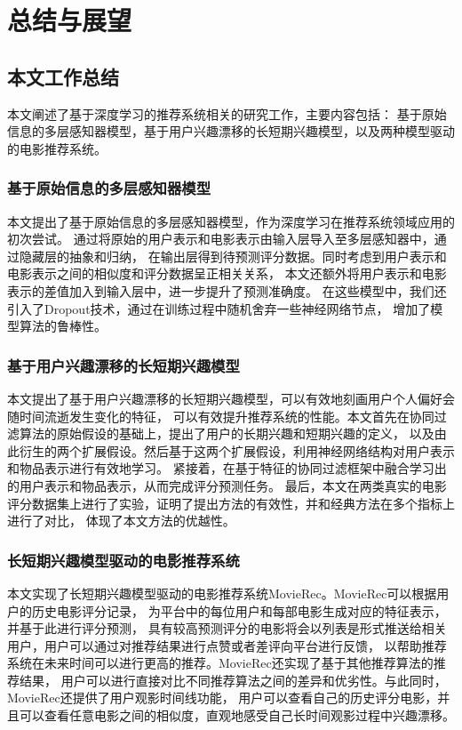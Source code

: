 \chapter{总结与展望}
\section{本文工作总结}
本文阐述了基于深度学习的推荐系统相关的研究工作，主要内容包括：
基于原始信息的多层感知器模型，基于用户兴趣漂移的长短期兴趣模型，以及两种模型驱动的电影推荐系统。

\subsection{基于原始信息的多层感知器模型}
本文提出了基于原始信息的多层感知器模型，作为深度学习在推荐系统领域应用的初次尝试。
通过将原始的用户表示和电影表示由输入层导入至多层感知器中，通过隐藏层的抽象和归纳，
在输出层得到待预测评分数据。同时考虑到用户表示和电影表示之间的相似度和评分数据呈正相关关系，
本文还额外将用户表示和电影表示的差值加入到输入层中，进一步提升了预测准确度。
在这些模型中，我们还引入了Dropout技术，通过在训练过程中随机舍弃一些神经网络节点，
增加了模型算法的鲁棒性。

\subsection{基于用户兴趣漂移的长短期兴趣模型}
本文提出了基于用户兴趣漂移的长短期兴趣模型，可以有效地刻画用户个人偏好会随时间流逝发生变化的特征，
可以有效提升推荐系统的性能。本文首先在协同过滤算法的原始假设的基础上，提出了用户的长期兴趣和短期兴趣的定义，
以及由此衍生的两个扩展假设。然后基于这两个扩展假设，利用神经网络结构对用户表示和物品表示进行有效地学习。
紧接着，在基于特征的协同过滤框架中融合学习出的用户表示和物品表示，从而完成评分预测任务。
最后，本文在两类真实的电影评分数据集上进行了实验，证明了提出方法的有效性，并和经典方法在多个指标上进行了对比，
体现了本文方法的优越性。

\subsection{长短期兴趣模型驱动的电影推荐系统}
本文实现了长短期兴趣模型驱动的电影推荐系统MovieRec。MovieRec可以根据用户的历史电影评分记录，
为平台中的每位用户和每部电影生成对应的特征表示，并基于此进行评分预测，
具有较高预测评分的电影将会以列表是形式推送给相关用户，用户可以通过对推荐结果进行点赞或者差评向平台进行反馈，
以帮助推荐系统在未来时间可以进行更高的推荐。MovieRec还实现了基于其他推荐算法的推荐结果，
用户可以进行直接对比不同推荐算法之间的差异和优劣性。与此同时，MovieRec还提供了用户观影时间线功能，
用户可以查看自己的历史评分电影，并且可以查看任意电影之间的相似度，直观地感受自己长时间观影过程中兴趣漂移。

